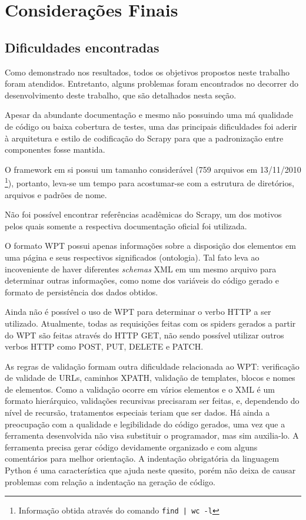


\pagebreak
\chapter{Considerações Finais}
\thispagestyle{fancy}

\section{Dificuldades encontradas}

Como demonstrado nos resultados, todos os objetivos propostos neste trabalho foram atendidos. Entretanto, alguns problemas foram encontrados no decorrer do desenvolvimento deste trabalho, que são detalhados nesta seção.

Apesar da abundante documentação e mesmo não possuindo uma má qualidade de código ou baixa cobertura de testes, uma das principais dificuldades foi aderir à arquitetura e estilo de codificação do Scrapy para que a padronização entre componentes fosse mantida.

O framework em si possui um tamanho considerável (759 arquivos em 13/11/2010 \footnote{Informação obtida através do comando \texttt{find | wc -l} }), portanto, leva-se um tempo para acostumar-se com a estrutura de diretórios, arquivos e padrões de nome.

Não foi possível encontrar referências acadêmicas do Scrapy, um dos motivos pelos quais somente a respectiva documentação oficial foi utilizada.

O formato WPT possui apenas informações sobre a disposição dos elementos em uma página e seus respectivos significados (ontologia). Tal fato leva ao incoveniente de haver diferentes \emph{schemas} XML em um mesmo arquivo para determinar outras informações, como nome dos variáveis do código gerado e formato de persistência dos dados obtidos.

Ainda não é possível o uso de WPT para determinar o verbo HTTP a ser utilizado. Atualmente, todas as requisições feitas com os spiders gerados a partir do WPT são feitas através do HTTP GET, não sendo possível utilizar outros verbos HTTP como POST, PUT, DELETE e PATCH. 

As regras de validação formam outra dificuldade relacionada ao WPT: verificação de validade de URLs, caminhos XPATH, validação de templates, blocos e nomes de elementos. Como a validação ocorre em vários elementos e o XML é um formato hierárquico, validações recursivas precisaram ser feitas, e, dependendo do nível de recursão, tratamentos especiais teriam que ser dados. 
Há ainda a preocupação com a qualidade e legibilidade do código gerados, uma vez que a ferramenta desenvolvida não visa substituir o programador, mas sim auxilia-lo. A ferramenta precisa gerar código devidamente organizado e com alguns comentários para melhor orientação. A indentação obrigatória da linguagem Python é uma característica que ajuda neste quesito, porém não deixa de causar problemas com relação a indentação na geração de código.

